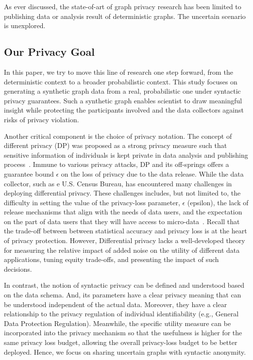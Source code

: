 As ever discussed, the state-of-art of graph privacy research has been limited to publishing data or analysis result of deterministic graphs. 
The uncertain scenario is unexplored. 
\subsection{Our Privacy Goal}
In this paper, we try to move this line of research one step forward, from the deterministic context to a broader probabilistic context.
This study focuses on generating a synthetic graph data from a real, probabilistic one under syntactic privacy guarantees. Such a synthetic graph enables scientist to draw meaningful insight while protecting the participants involved and the data collectors against risks of privacy violation. 

Another critical component is the choice of privacy notation. 
The concept of different privacy (DP) was proposed as a strong privacy measure such that sensitive information of individuals is kept private in data analysis and publishing process~\cite{Sala_Sharing_2011,Xiao_Differentially_2014}.
Immune to various privacy attacks, DP and its off-springs offers a guarantee bound $\epsilon$ on the loss of privacy due to the data release. 
While the data collector, such as e U.S. Census Bureau, has encountered many challenges in deploying differential privacy. These challenges includes, but not limited to, the difficulty in setting the value of the privacy-loss parameter, $\epsilon$ (epsilon), the lack of release mechanisms that align with the needs of data users, and the expectation on the part of data users that they will have access to micro-data~\cite{Simson:2018}. 
Recall that the trade-off between between statistical
accuracy and privacy loss is at the heart of privacy protection. 
However, Differential privacy lacks a well-developed
theory for measuring the relative impact of added noise on the utility of different data applications, tuning equity trade-offs, and presenting the impact of such decisions. 

In contrast, the notion of syntactic privacy can be defined and understood based on the data schema. And, its parameters have a clear privacy meaning that can be understood independent of the actual data. Moreover, they have a clear relationship to the privacy regulation of individual identifiability (e.g., General Data Protection Regulation).
Meanwhile, the specific utility measure can be incorporated into the privacy mechanism so that the usefulness is higher for the same privacy loss budget, allowing the overall privacy-loss budget to be better deployed.
Hence, we focus on sharing uncertain graphs with syntactic anonymity. 